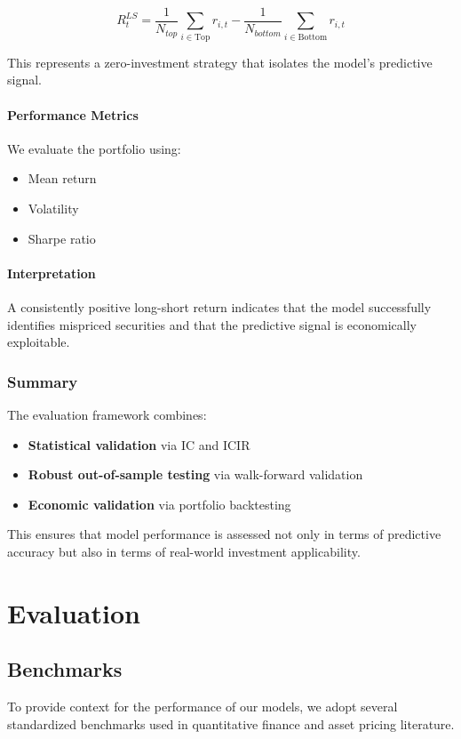 \documentclass[11pt]{article}
\begin{document}
\[
R_t^{LS} = \frac{1}{N_{top}} \sum_{i \in \text{Top}} r_{i,t}
- \frac{1}{N_{bottom}} \sum_{i \in \text{Bottom}} r_{i,t}
\]

This represents a zero-investment strategy that isolates the model's predictive signal.

\paragraph{Performance Metrics}

We evaluate the portfolio using:
\begin{itemize}
    \item Mean return
    \item Volatility
    \item Sharpe ratio
\end{itemize}

\paragraph{Interpretation}

A consistently positive long-short return indicates that the model successfully identifies mispriced securities and that the predictive signal is economically exploitable.

\subsubsection{Summary}

The evaluation framework combines:
\begin{itemize}
    \item \textbf{Statistical validation} via IC and ICIR
    \item \textbf{Robust out-of-sample testing} via walk-forward validation
    \item \textbf{Economic validation} via portfolio backtesting
\end{itemize}

This ensures that model performance is assessed not only in terms of predictive accuracy but also in terms of real-world investment applicability.
\section{Evaluation}
\subsection{Benchmarks}
To provide context for the performance of our models, we adopt several standardized benchmarks used in quantitative finance and asset pricing literature.
\end{document}
